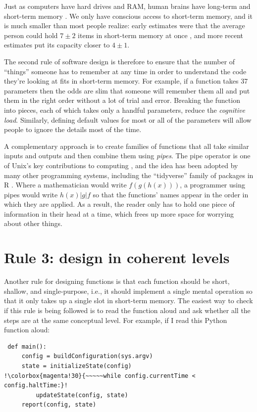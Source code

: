 \documentclass[10pt,letterpaper]{article}
\begin{document}
Just as computers have hard drives and RAM,
human brains have long-term and short-term memory \cite{Hermans2021}.
We only have conscious access to short-term memory,
and it is much smaller than most people realize:
early estimates were that the average person could hold
$7{\pm}2$ items in short-term memory at once \cite{Miller1956},
and more recent estimates put its capacity closer to $4{\pm}1$.

The second rule of software design is therefore
to ensure that the number of ``things'' someone has to remember at any time
in order to understand the code they're looking at
fits in short-term memory.
For example,
if a function takes 37 parameters
then the odds are slim
that someone will remember them all and put them in the right order
without a lot of trial and error.
Breaking the function into pieces,
each of which takes only a handful parameters,
reduce the \emph{cognitive load}.
Similarly,
defining default values for most or all of the parameters
will allow people to ignore the details most of the time.

A complementary approach is to create families of functions
that all take similar inputs and outputs
and then combine them using \emph{pipes}.
The pipe operator is one of Unix's key contributions to computing \cite{Kernighan2019},
and the idea has been adopted by many other programming systems,
including the ``tidyverse'' family of packages in R \cite{Wickham2017}.
Where a mathematician would write $f(g(h(x)))$,
a programmer using pipes would write $h(x) | g | f$
so that the functions' names appear in the order in which they are applied.
As a result,
the reader only has to hold one piece of information in their head at a time,
which frees up more space for worrying about other things.

\section*{Rule 3: design in coherent levels}

Another rule for designing functions is that
each function should be short, shallow, and single-purpose,
i.e.,
it should implement a single mental operation
so that it only takes up a single slot in short-term memory.
The easiest way to check if this rule is being followed
is to read the function aloud
and ask whether all the steps are at the same conceptual level.
For example,
if I read this Python function aloud:

\begin{lstlisting}
 def main():
     config = buildConfiguration(sys.argv)
     state = initializeState(config)
!\colorbox{magenta!30}{~~~~~while config.currentTime < config.haltTime:}!
         updateState(config, state)
     report(config, state)
\end{lstlisting}
\end{document}

